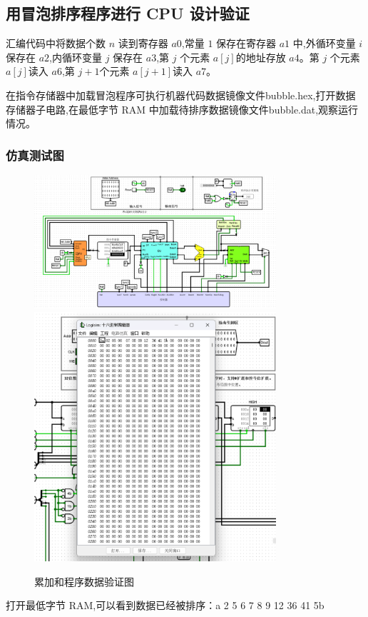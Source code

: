 \documentclass{article}
\begin{document}
    \subsection{用冒泡排序程序进行 CPU 设计验证}

    汇编代码中将数据个数 $n$ 读到寄存器 $a0$,常量 $1$ 保存在寄存器 $a1$ 中,外循环变量 $i$ 保存在 $a2$,内循环变量 $j$ 保存在 $a3$,第 $j$ 个元素 $a[j]$的地址存放 $a4$。第 $j$ 个元素 $a[j]$读入 $a6$,第 $j+1 $个元素 $a[j+1]$读入 $a7$。\par
    在指令存储器中加载冒泡程序可执行机器代码数据镜像文件bubble.hex,打开数据存储器子电路,在最低字节 RAM 中加载待排序数据镜像文件bubble.dat,观察运行情况。

    \subsubsection{仿真测试图}

    \begin{figure}[H]
        \centering
        \includegraphics[width=0.8\textwidth]{4.5.1.png}
        \includegraphics[width=0.8\textwidth]{4.5.2.png}
        \caption{累加和程序数据验证图}
    \end{figure}
    打开最低字节 RAM,可以看到数据已经被排序：a 2 5 6 7 8 9 12 36 41 5b
\end{document}
